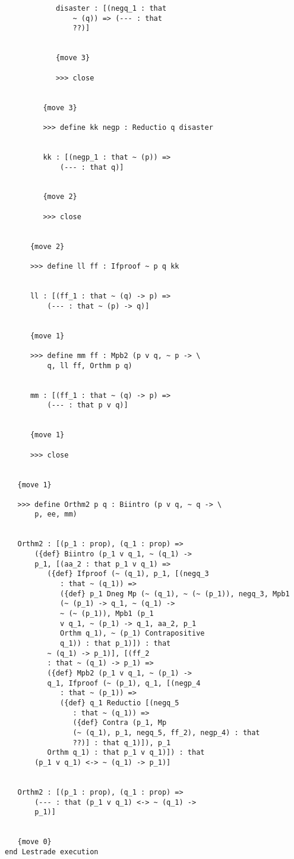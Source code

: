 \documentclass[12pt]{article}
\begin{document}
\begin{verbatim}
            disaster : [(negq_1 : that 
                ~ (q)) => (--- : that 
                ??)]


            {move 3}

            >>> close


         {move 3}

         >>> define kk negp : Reductio q disaster


         kk : [(negp_1 : that ~ (p)) => 
             (--- : that q)]


         {move 2}

         >>> close


      {move 2}

      >>> define ll ff : Ifproof ~ p q kk


      ll : [(ff_1 : that ~ (q) -> p) => 
          (--- : that ~ (p) -> q)]


      {move 1}

      >>> define mm ff : Mpb2 (p v q, ~ p -> \
          q, ll ff, Orthm p q)


      mm : [(ff_1 : that ~ (q) -> p) => 
          (--- : that p v q)]


      {move 1}

      >>> close


   {move 1}

   >>> define Orthm2 p q : Biintro (p v q, ~ q -> \
       p, ee, mm)


   Orthm2 : [(p_1 : prop), (q_1 : prop) => 
       ({def} Biintro (p_1 v q_1, ~ (q_1) -> 
       p_1, [(aa_2 : that p_1 v q_1) => 
          ({def} Ifproof (~ (q_1), p_1, [(negq_3 
             : that ~ (q_1)) => 
             ({def} p_1 Dneg Mp (~ (q_1), ~ (~ (p_1)), negq_3, Mpb1 
             (~ (p_1) -> q_1, ~ (q_1) -> 
             ~ (~ (p_1)), Mpb1 (p_1 
             v q_1, ~ (p_1) -> q_1, aa_2, p_1 
             Orthm q_1), ~ (p_1) Contrapositive 
             q_1)) : that p_1)]) : that 
          ~ (q_1) -> p_1)], [(ff_2 
          : that ~ (q_1) -> p_1) => 
          ({def} Mpb2 (p_1 v q_1, ~ (p_1) -> 
          q_1, Ifproof (~ (p_1), q_1, [(negp_4 
             : that ~ (p_1)) => 
             ({def} q_1 Reductio [(negq_5 
                : that ~ (q_1)) => 
                ({def} Contra (p_1, Mp 
                (~ (q_1), p_1, negq_5, ff_2), negp_4) : that 
                ??)] : that q_1)]), p_1 
          Orthm q_1) : that p_1 v q_1)]) : that 
       (p_1 v q_1) <-> ~ (q_1) -> p_1)]


   Orthm2 : [(p_1 : prop), (q_1 : prop) => 
       (--- : that (p_1 v q_1) <-> ~ (q_1) -> 
       p_1)]


   {move 0}
end Lestrade execution
\end{verbatim}
\end{document}
